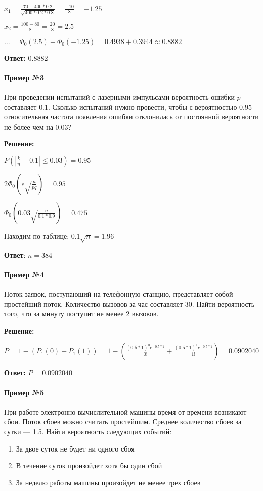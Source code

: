 \documentclass{article}
\begin{document}
$x_1 = \frac{70 - 400 * 0.2}{\sqrt{400 * 0.2 * 0.8}} = \frac{-10}{8} = -1.25$

$x_2 = \frac{100 - 80}{8} = \frac{20}{8} = 2.5$

$\dots = \Phi_{0}(2.5) - \Phi_0(-1.25) = 0.4938 + 0.3944 \approx 0.8882$

\textbf{Ответ:} 0.8882

\paragraph{Пример №3}

При проведении испытаний с лазерными импульсами вероятность ошибки $p$ составляет $0.1$. Сколько испытаний нужно провести, чтобы с вероятностью $0.95$ относительная частота появления ошибки отклонилась от постоянной вероятности не более чем на $0.03$?

\textbf{Решение:}

$P(|\frac{k}{n} - 0.1| \le 0.03) = 0.95$

$2 \Phi_0 (\epsilon \sqrt{\frac{n}{pq}}) = 0.95$

$\Phi_0(0.03 \sqrt{\frac{n}{0.1*0.9}}) = 0.475$

Находим по таблице: $0.1\sqrt{n} = 1.96$

\textbf{Ответ}: $n = 384$

\paragraph{Пример №4}

Поток заявок, поступающий на телефонную станцию, представляет собой простейший поток. Количество вызовов за час составляет 30. Найти вероятность того, что за минуту поступит не менее 2 вызовов.

\textbf{Решение:}

$P = 1 - (P_{1}(0) + P_{1}(1)) = 1 - (\frac{(0.5 * 1)^{0} e^{-0.5 * 1}}{0!} + \frac{(0.5 * 1)^{1} e^{-0.5 * 1}}{1!}) = 0.0902040$

\textbf{Ответ:} $P = 0.0902040$

\paragraph{Пример №5}

При работе электронно-вычислительной машины время от времени возникают сбои. Поток сбоев можно считать простейшим. Среднее количество сбоев за сутки — 1.5. Найти вероятность следующих событий:

\begin{enumerate}
    \item За двое суток не будет ни одного сбоя
    \item В течение суток произойдет хотя бы один сбой
    \item За неделю работы машины произойдет не менее трех сбоев
\end{enumerate}
\end{document}
